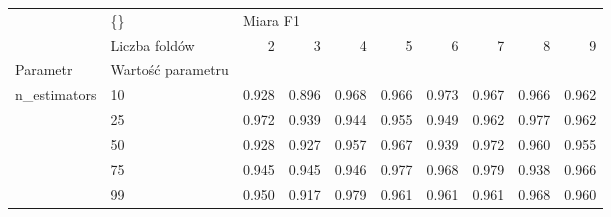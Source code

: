 \begin{tabular}{llrrrrrrrr}
\hline
             & \{\} & \multicolumn{8}{l}{Miara F1} \\
             & Liczba foldów &        2 &      3 &      4 &      5 &      6 &      7 &      8 &      9 \\
Parametr & Wartość parametru &          &        &        &        &        &        &        &        \\
\hline
n\_estimators & 10 &    0.928 &  0.896 &  0.968 &  0.966 &  0.973 &  0.967 &  0.966 &  0.962 \\
             & 25 &    0.972 &  0.939 &  0.944 &  0.955 &  0.949 &  0.962 &  0.977 &  0.962 \\
             & 50 &    0.928 &  0.927 &  0.957 &  0.967 &  0.939 &  0.972 &  0.960 &  0.955 \\
             & 75 &    0.945 &  0.945 &  0.946 &  0.977 &  0.968 &  0.979 &  0.938 &  0.966 \\
             & 99 &    0.950 &  0.917 &  0.979 &  0.961 &  0.961 &  0.961 &  0.968 &  0.960 \\
\hline
\end{tabular}
